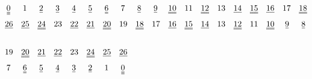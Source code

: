 \documentclass[UTF8,a4paper,zihao=-4]{article}
\renewcommand\underline{\bgroup\markoverwith
   {%
     \rule[-0.5ex]{2pt}{0.4pt}%
   }%
   \ULon}
\newcommand\doubleunderline{\bgroup\markoverwith
   {%
     \rule[-0.5ex]{2pt}{0.4pt}%
     \llap{{\rule[-0.8ex]{2pt}{0.4pt}}}%
   }%
   \ULon}
\newcommand\tripleunderline{\bgroup\markoverwith
   {%
     \rule[-0.5ex]{2pt}{0.4pt}%
     \llap{{\rule[-0.8ex]{2pt}{0.4pt}}}%
     \llap{{\rule[-1.1ex]{2pt}{0.4pt}}}%
   }%
   \ULon}
\begin{document}
\begin{align*}
&\hspace{0.2em}\tripleunderline0\hspace{1.5em}1\hspace{1.5em}\underline2\hspace{1.5em}\underline3\hspace{1.5em}\underline4\hspace{1.5em}\underline5\hspace{1.5em}\doubleunderline6\hspace{1.5em}7\hspace{1.5em}\underline8\hspace{1.5em}\underline9\hspace{1.3em}\doubleunderline{10}\hspace{1em}11\hspace{1em}\doubleunderline{12}\hspace{1em}13\hspace{1em}\underline{14}\hspace{1em}\doubleunderline{15}\hspace{1em}\underline{16}\hspace{1em}17\hspace{1em}\doubleunderline{18}\\
&\underline{26}\quad\underline{25}\quad\doubleunderline{24}\quad23\quad\underline{22}\quad\underline{21}\quad\doubleunderline{20}\quad19\quad\doubleunderline{18}\quad17\quad\underline{16}\quad\doubleunderline{15}\quad\underline{14}\quad13\quad\doubleunderline{12}\quad11\quad\doubleunderline{10}\hspace{1.3em}\underline9\hspace{1.5em}\underline8\\\\
&19\quad\doubleunderline{20}\quad\underline{21}\quad\underline{22}\quad23\quad\doubleunderline{24}\quad\underline{25}\quad\underline{26}\\
&\hspace{0.2em}7\hspace{1.5em}\doubleunderline6\hspace{1.5em}\underline5\hspace{1.5em}\underline4\hspace{1.5em}\underline3\hspace{1.5em}\underline2\hspace{1.5em}1\hspace{1.5em}\tripleunderline0
\end{align*}
\end{document}
